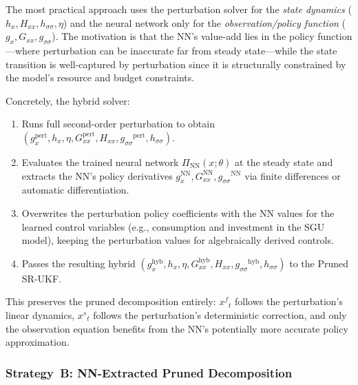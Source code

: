 \documentclass[12pt,a4paper]{article}
\newcommand{\xf}{{x^{f}}}
\newcommand{\xs}{{x^{s}}}
\newcommand{\gx}{g_x}
\newcommand{\hx}{h_x}
\newcommand{\Gxx}{G_{xx}}
\newcommand{\Hxx}{H_{xx}}
\newcommand{\gss}{{g_{\sigma\sigma}}}
\newcommand{\hsig}{{h_{\sigma\sigma}}}
\begin{document}
The most practical approach uses the perturbation solver for the
\emph{state dynamics} ($\hx, \Hxx, \hsig, \eta$) and the neural
network only for the \emph{observation/policy function}
($\gx, \Gxx, \gss$). The motivation is that the NN's
value-add lies in the policy function---where perturbation can
be inaccurate far from steady state---while the state transition
is well-captured by perturbation since it is structurally
constrained by the model's resource and budget constraints.

Concretely, the hybrid solver:
\begin{enumerate}[nosep]
\item Runs full second-order perturbation to obtain
$(\gx^{\mathrm{pert}}, \hx, \eta, \Gxx^{\mathrm{pert}}, \Hxx, \gss^{\mathrm{pert}}, \hsig)$.
\item Evaluates the trained neural network $\Pi_{\mathrm{NN}}(x;\theta)$
at the steady state and extracts the NN's policy derivatives
$\gx^{\mathrm{NN}}, \Gxx^{\mathrm{NN}}, \gss^{\mathrm{NN}}$
via finite differences or automatic differentiation.
\item Overwrites the perturbation policy coefficients with the
NN values for the learned control variables (e.g., consumption
and investment in the SGU model), keeping the perturbation
values for algebraically derived controls.
\item Passes the resulting hybrid
$(\gx^{\mathrm{hyb}}, \hx, \eta, \Gxx^{\mathrm{hyb}},
\Hxx, \gss^{\mathrm{hyb}}, \hsig)$
to the Pruned SR-UKF.
\end{enumerate}
This preserves the pruned decomposition entirely: $\xf_t$ follows
the perturbation's linear dynamics, $\xs_t$ follows the perturbation's
deterministic correction, and only the observation equation benefits
from the NN's potentially more accurate policy approximation.

\subsubsection{Strategy~B: NN-Extracted Pruned Decomposition}
\end{document}
